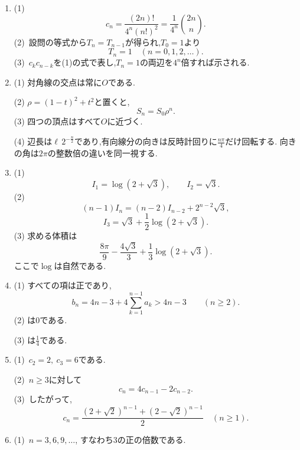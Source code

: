 \begin{enumerate}[label=\textbf{問\arabic*.},leftmargin=3.8em,format=\bookitemlink{practice-entrance}{answer}{problem}]
                (3)~奇数項の個数は$s$である.$s\ge1$のとき,$a_0,\ldots,a_{s-1}$が奇数であり,$a_s=3^s t-1$は偶数である.$s=0$のときは初項から偶数である.
          \item (1)~
                \[
                  c_n=\frac{(2n)!}{4^n(n!)^2}
                     =\frac1{4^n}\binom{2n}{n}.
                \]
                (2)~設問の等式から$T_n=T_{n-1}$が得られ,$T_0=1$より
                \[
                  T_n=1\quad(n=0,1,2,\ldots).
                \]
                (3)~$c_kc_{n-k}$を(1)の式で表し,$T_n=1$の両辺を$4^n$倍すれば示される.
          \item (1) 対角線の交点は常に$O$である.
                \par\noindent
                (2) $\rho=(1-t)^2+t^2$と置くと,
                \[
                 S_n=S_0\rho^n.
                \]
                (3) 四つの頂点はすべて$O$に近づく.
                \par\noindent
                (4) 辺長は$\ell\,2^{-\frac{n}{2}}$であり,有向線分の向きは反時計回りに$\displaystyle \frac{n\pi}{4}$だけ回転する.
                向きの角は$2\pi$の整数倍の違いを同一視する.
          \item (1)
                \[
                 I_1=\log(2+\sqrt3),\qquad I_2=\sqrt3.
                \]
                (2)
                \[
                 (n-1)I_n=(n-2)I_{n-2}+2^{n-2}\sqrt3,
                \]
                \[
                 I_3=\sqrt3+\frac12\log(2+\sqrt3).
                \]
                (3) 求める体積は
                \[
                 \frac{8\pi}{9}-\frac{4\sqrt3}{3}
                 +\frac13\log(2+\sqrt3).
                \]
                ここで$\log$は自然である.
          \item (1) すべての項は正であり,
                \[
                 b_n=4n-3+4\sum_{k=1}^{n-1}a_k>4n-3
                 \qquad(n\geq2).
                \]
                (2) は$0$である.
                \par\noindent
                (3) は$\displaystyle \frac{1}{4}$である.
          \item (1)~$c_2=2,\ c_3=6$である.

                (2)~$n\ge3$に対して
                \[
                  c_n=4c_{n-1}-2c_{n-2}.
                \]
                (3)~したがって,
                \[
                  \boxed{\displaystyle
                  c_n=\frac{(2+\sqrt2)^{n-1}+(2-\sqrt2)^{n-1}}2}
                  \quad(n\ge1).
                \]
          \item (1)~$n=3,6,9,\ldots$, すなわち$3$の正の倍数である.


\end{enumerate}
